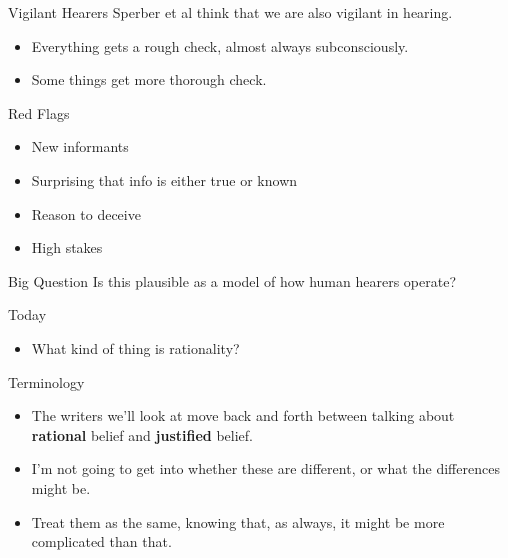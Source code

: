 \documentclass[
  17pt,
  letterpaper,
  ignorenonframetext,
  aspectratio=169,
]{beamer}
\providecommand{\tightlist}{%
  \setlength{\itemsep}{0pt}\setlength{\parskip}{0pt}}\usepackage{longtable,booktabs,array}
\begin{document}
\begin{frame}{Vigilant Hearers}
\protect\hypertarget{vigilant-hearers}{}
Sperber et al think that we are also vigilant in hearing.

\begin{itemize}[<+->]
\tightlist
\item
  Everything gets a rough check, almost always subconsciously.
\item
  Some things get more thorough check.
\end{itemize}
\end{frame}

\begin{frame}{Red Flags}
\protect\hypertarget{red-flags}{}
\begin{itemize}[<+->]
\tightlist
\item
  New informants
\item
  Surprising that info is either true or known
\item
  Reason to deceive
\item
  High stakes
\end{itemize}
\end{frame}

\begin{frame}{Big Question}
\protect\hypertarget{big-question}{}
Is this plausible as a model of how human hearers operate?
\end{frame}

\begin{frame}{Today}
\protect\hypertarget{today}{}
\begin{itemize}[<+->]
\tightlist
\item
  What kind of thing is rationality?
\end{itemize}
\end{frame}

\begin{frame}{Terminology}
\protect\hypertarget{terminology}{}
\begin{itemize}[<+->]
\tightlist
\item
  The writers we'll look at move back and forth between talking about
  \textbf{rational} belief and \textbf{justified} belief.
\item
  I'm not going to get into whether these are different, or what the
  differences might be.
\item
  Treat them as the same, knowing that, as always, it might be more
  complicated than that.
\end{itemize}
\end{frame}
\end{document}
